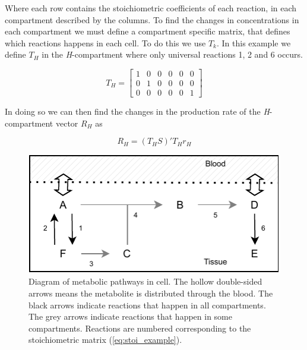 \documentclass{IEEEtran}
\begin{document}

Where each row contains the stoichiometric coefficients of each reaction, in each compartment described by the columns. To find the changes in concentrations in each compartment we must define a compartment specific matrix, that defines which reactions happens in each cell. To do this we use $T_k$. In this example we define $T_H$ in the \textit{H}-compartment where only universal reactions 1, 2 and 6 occurs.


\begin{equation}
    T_H = 
    \begin{bmatrix}
        1 & 0 & 0 & 0 & 0 & 0 \\
        0 & 1 & 0 & 0 & 0 & 0 \\
        0 & 0 & 0 & 0 & 0 & 1
    \end{bmatrix}
\end{equation}

In doing so we can then find the changes in the production rate of the \textit{H}-compartment vector $R_H$ as

 
\begin{equation}
    R_H =  (T_HS)'T_Hr_H 
\end{equation}


\begin{figure}[H]
    \centering
    \includegraphics[width=0.8\columnwidth]{Diagrams/example_cell.pdf}
    \caption{Diagram of metabolic pathways in cell. The hollow double-sided arrows means the metabolite is distributed through the blood. The black arrows indicate reactions that happen in all compartments. The grey arrows indicate reactions that happen in some compartments. Reactions are numbered corresponding to the stoichiometric matrix (\ref{eq:stoi_example}).}
    \label{fig:example_metabolic_map}
\end{figure}
\end{document}
